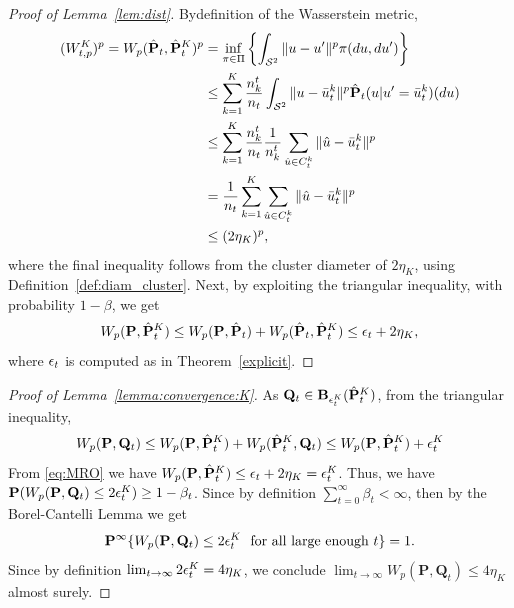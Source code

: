 \label{app:bounded_perf_1}
\begin{proof}[Proof of Lemma~\ref{lem:dist}]
Bydefinition of the Wasserstein metric,
\begin{equation*}
\begin{aligned}
(W^K_{t,p})^p = W_p(\hat{{\mathbf P}}_t, \hat{\mathbf{P}}^K_t)^p & = \inf_{\pi \in \Pi}\left \{\int_{{\mathcal{S}}^2} \|u - u^\prime\|^p\pi(du, du^\prime)\right\}\\
& \leq \sum_{k=1}^K \frac{n^t_k}{n_t} \int_{\mathcal{S}^2}\|u-\bar{u}^k_t\|^p \hat{{\mathbf P}}_t(u|u^\prime = \bar{u}^k_t)(du)\\
& \leq \sum_{k=1}^K \frac{n_k^t}{n_t} \frac{1}{n_k^t} \sum_{ \hat{u}\in C^k_t}\|\hat{u} - \bar{u}^k_t\|^p\\
& = \frac{1}{n_t}  \sum_{k=1}^K\sum_{\hat{u}\in C^k_t}\|\hat{u}- \bar{u}^k_t\|^p\\ 
& \leq (2\eta_K)^p,
\end{aligned}
\end{equation*}
where the final inequality follows from the cluster diameter of $2\eta_K$, using Definition~\ref{def:diam_cluster}. Next, by exploiting the triangular inequality, with probability $1-\beta$, we get
\begin{equation}\label{eq:MRO}
W_p(\mathbf{P}, \hat{\mathbf{P}}^K_t) \leq W_p(\mathbf{P}, \hat{{\mathbf P}}_t) + W_p(\hat{\mathbf{P}}_t, \hat{\mathbf{P}}^K_t) \leq \epsilon_t + 2\eta_K,
\end{equation}
where $\epsilon_t$ is computed as in Theorem~\ref{explicit}. 
\end{proof}

\begin{proof}[Proof of Lemma~\ref{lemma:convergence:K}]
As $\mathbf{Q}_t \in \mathbf{B}_{\epsilon^K_{t}}(\hat{\mathbf{P}}_{t}^K)$, from the triangular inequality,
$$
W_p(\mathbf{P}, \mathbf{Q}_t) \leq W_p(\mathbf{P}, \hat{\mathbf{P}}^K_{t}) + W_p(\hat{\mathbf{P}}^K_{t}, \mathbf{Q}_t) \leq W_p(\mathbf{P}, \hat{\mathbf{P}}^K_{t}) + \epsilon^K_{t} $$
From \eqref{eq:MRO} we have $W_p(\mathbf{P}, \hat{\mathbf{P}}^K_{t}) \leq \epsilon_{t} + 2\eta_K = \epsilon^K_{t}$. Thus, we have $\mathbf{P}(W_p(\mathbf{P}, \mathbf{Q}_t) \leq 2\epsilon^K_{t}) \geq 1 - \beta_{t}$.
Since by definition $\sum_{t=0}^\infty \beta_t < \infty$, then by the Borel-Cantelli Lemma we get
$$
\mathbf{P}^\infty\{W_p(\mathbf{P}, \mathbf{Q}_t) \leq 2\epsilon^K_{t} \text{~~for all large enough $t$}\} = 1.
$$
Since by definition
$\lim_{t \rightarrow \infty} 2\epsilon^K_{t} = 4\eta_K$, we conclude $\lim_{t\rightarrow \infty}  W_p(\mathbf{P}, \mathbf{Q}_t) \leq 4\eta_K$ almost surely.
\end{proof}


